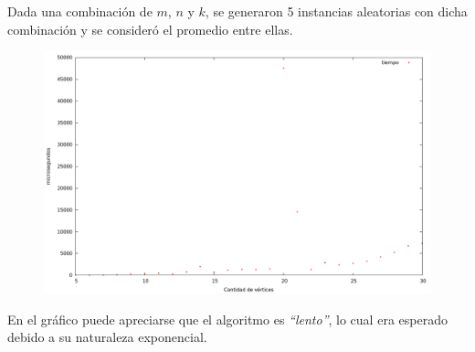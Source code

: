 Dada una combinación de $m$, $n$ y $k$, se generaron 5 instancias aleatorias con dicha combinación y se consideró el promedio entre ellas.

\vspace*{0.5cm}

\begin{figure}[h]
  \begin{center}
    \includegraphics[scale=0.35]{imagenes/grafico-exacto.png}
  \end{center}
\end{figure}

\vspace*{0.5cm}

En el gráfico puede apreciarse que el algoritmo es \textit{``lento''}, lo cual era esperado debido a su naturaleza exponencial.
